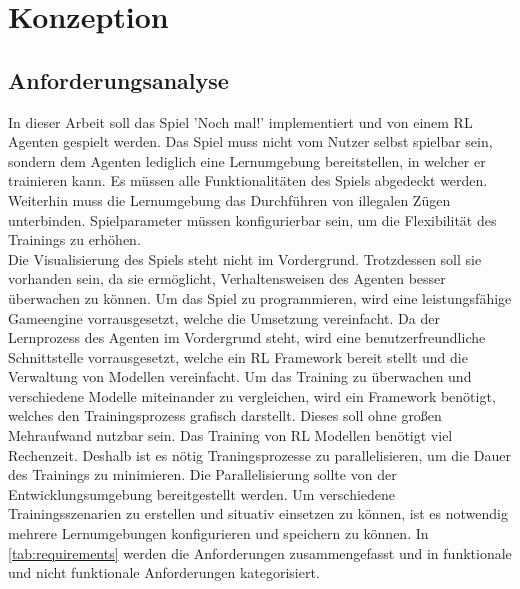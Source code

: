
\clearpage
\chapter{Konzeption}
\section{Anforderungsanalyse}
In dieser Arbeit soll das Spiel 'Noch mal!' implementiert und von einem RL Agenten gespielt werden. Das Spiel muss nicht vom Nutzer selbst spielbar sein, sondern dem Agenten lediglich eine Lernumgebung bereitstellen, in welcher er trainieren kann. Es müssen alle Funktionalitäten des Spiels abgedeckt werden. Weiterhin muss die Lernumgebung das Durchführen von illegalen Zügen unterbinden. Spielparameter müssen konfigurierbar sein, um die Flexibilität des Trainings zu erhöhen.\\
Die Visualisierung des Spiels steht nicht im Vordergrund. Trotzdessen soll sie vorhanden sein, da sie ermöglicht, Verhaltensweisen des Agenten besser überwachen zu können. Um das Spiel zu programmieren, wird eine leistungsfähige Gameengine vorrausgesetzt, welche die Umsetzung vereinfacht. Da der Lernprozess des Agenten im Vordergrund steht, wird eine benutzerfreundliche Schnittstelle vorrausgesetzt, welche ein RL Framework bereit stellt und die Verwaltung von Modellen vereinfacht. Um das Training zu überwachen und verschiedene Modelle miteinander zu vergleichen, wird ein Framework benötigt, welches den Trainingsprozess grafisch darstellt. Dieses soll ohne großen Mehraufwand nutzbar sein. Das Training von RL Modellen benötigt viel Rechenzeit. Deshalb ist es nötig Traningsprozesse zu parallelisieren, um die Dauer des Trainings zu minimieren. Die Parallelisierung sollte von der Entwicklungsumgebung bereitgestellt werden. Um verschiedene Trainingsszenarien zu erstellen und situativ einsetzen zu können, ist es notwendig mehrere Lernumgebungen konfigurieren und speichern zu können. 
In \ref{tab:requirements} werden die Anforderungen zusammengefasst und in funktionale und nicht funktionale Anforderungen kategorisiert.

